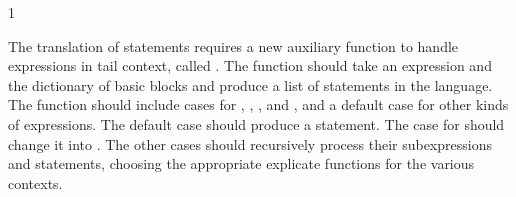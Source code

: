 \documentclass[7x10]{TimesAPriori_MIT}%
\def\pythonEd{1}
\def\edition{1}
\newcommand{\pythonColor}[0]{}
\numberwithin{theorem}{chapter}
\numberwithin{definition}{chapter}
\numberwithin{equation}{chapter}
\begin{document}
{\if\edition\pythonEd\pythonColor

The translation of  statements requires a new auxiliary
function to handle expressions in tail context, called
. The function should take an expression and the
dictionary of basic blocks and produce a list of statements in the
\LangCFun{} language.  The  function should
include cases for , , , and ,
and a default case for other kinds of expressions. The default case
should produce a  statement. The case for 
should change it into .  The other cases should
recursively process their subexpressions and statements, choosing the
appropriate explicate functions for the various contexts.
  
\fi}

\newcommand{\CfunASTRacket}{
\begin{array}{lcl}
\Exp &::= & \FUNREF{\itm{label}}{\Int} \MID \CALL{\Atm}{\LP\Atm\ldots\RP} \\
\Tail &::= & \TAILCALL{\Atm}{\Atm\ldots} \\
\Def &::=& \DEF{\itm{label}}{\LP[\Var\key{:}\Type]\ldots\RP}{\Type}{\itm{info}}{\LP\LP\itm{label}\,\key{.}\,\Tail\RP\ldots\RP}
\end{array}
}

\newcommand{\CfunASTPython}{
\begin{array}{lcl}
\Exp &::= & \FUNREF{\itm{label}}{\Int} \MID \CALL{\Atm}{\Atm^{*}} \\
\Tail &::= & \TAILCALL{\Atm}{\Atm^{*}} \\
\Params &::=& \LS\LP\Var\key{,}\Type\RP\code{,}\ldots\RS \\
\Block &::=& \itm{label}\key{:} \Stmt^{*}\;\Tail \\
\Blocks &::=& \LC\Block\code{,}\ldots\RC \\
\Def &::=& \DEF{\itm{label}}{\Params}{\Blocks}{\key{None}}{\Type}{\key{None}} 
\end{array}
}
\end{document}
